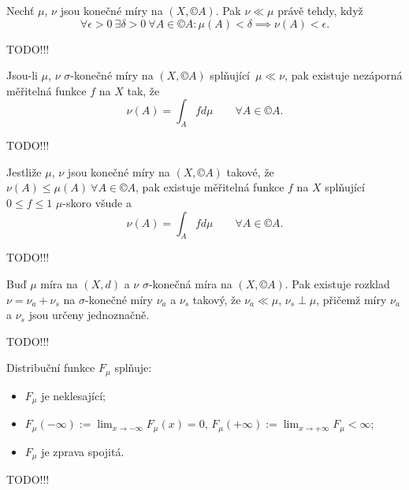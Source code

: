 \documentclass[12pt]{article}					%
\begin{document}
\begin{veta}
	Nechť $\mu$, $\nu$ jsou konečné míry na $(X, ©A)$. Pak $\nu \ll \mu$ právě tehdy, když
	$$ \forall \epsilon > 0\ \exists \delta > 0\ \forall A \in ©A: \mu(A) < \delta \implies \nu(A) < \epsilon. $$

	\begin{dukazin}
		TODO!!!
	\end{dukazin}
\end{veta}

\begin{veta}
	Jsou-li $\mu$, $\nu$ $\sigma$-konečné míry na $(X, ©A)$ splňující $\mu \ll \nu$, pak existuje nezáporná měřitelná funkce $f$ na $X$ tak, že
	$$ \nu(A) = \int_A f d\mu \qquad \forall A \in ©A. $$

	\begin{dukazin}
		TODO!!!
	\end{dukazin}
\end{veta}

\begin{lemma}
	Jestliže $\mu$, $\nu$ jsou konečné míry na $(X, ©A)$ takové, že $\nu(A) ≤ \mu(A)\ \forall A \in ©A$, pak existuje měřitelná funkce $f$ na $X$ splňující $0 ≤ f ≤ 1$ $\mu$-skoro všude a
	$$ \nu(A) = \int_A f d\mu \qquad \forall A \in ©A. $$

	\begin{dukazin}
		TODO!!!
	\end{dukazin}
\end{lemma}


\begin{veta}
	Buď $\mu$ míra na $(X, d)$ a $\nu$ $\sigma$-konečná míra na $(X, ©A)$. Pak existuje rozklad $\nu = \nu_a + \nu_s$ na $\sigma$-konečné míry $\nu_a$ a $\nu_s$ takový, že $\nu_a \ll \mu$, $\nu_s \perp \mu$, přičemž míry $\nu_a$ a $\nu_s$ jsou určeny jednoznačně.

	\begin{dukazin}
		TODO!!!
	\end{dukazin}
\end{veta}


\begin{lemma}
	Distribuční funkce $F_\mu$ splňuje:

	\begin{itemize}
		\item $F_\mu$ je neklesající;
		\item $F_\mu(-∞) := \lim_{x \rightarrow -∞} F_\mu(x) = 0$, $F_\mu(+∞) := \lim_{x \rightarrow +∞} F_\mu < ∞$;
		\item $F_\mu$ je zprava spojitá.
	\end{itemize}

	\begin{dukazin}
		TODO!!!
	\end{dukazin}
\end{lemma}
\end{document}
